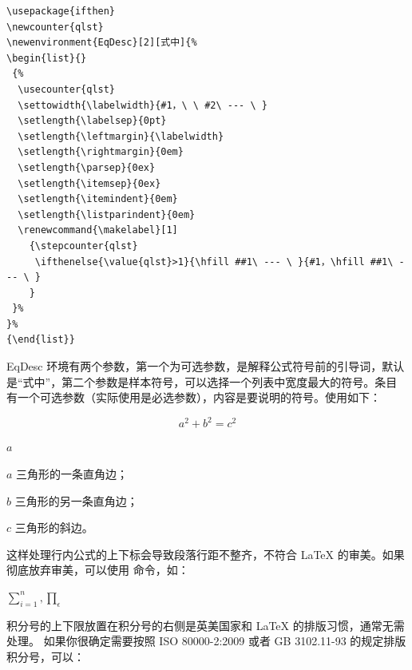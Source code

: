 \begin{verbatim}
\usepackage{ifthen}
\newcounter{qlst}
\newenvironment{EqDesc}[2][式中]{%
\begin{list}{}
 {%
  \usecounter{qlst}
  \settowidth{\labelwidth}{#1，\ \ #2\ --- \ }
  \setlength{\labelsep}{0pt}
  \setlength{\leftmargin}{\labelwidth}
  \setlength{\rightmargin}{0em}
  \setlength{\parsep}{0ex}
  \setlength{\itemsep}{0ex}
  \setlength{\itemindent}{0em}
  \setlength{\listparindent}{0em}
  \renewcommand{\makelabel}[1]
    {\stepcounter{qlst}
     \ifthenelse{\value{qlst}>1}{\hfill ##1\ --- \ }{#1，\hfill ##1\ --- \ }
    }
 }%
}%
{\end{list}}
\end{verbatim}

EqDesc
环境有两个参数，第一个为可选参数，是解释公式符号前的引导词，默认是``式中''，第二个参数是样本符号，可以选择一个列表中宽度最大的符号。条目  有一个可选参数（实际使用是必选参数），内容是要说明的符号。使用如下：

\begin{example}
\[ a^2+b^2=c^2 \]
\begin{EqDesc}[其中]{$a$}
   \item[$a$] 三角形的一条直角边；
   \item[$b$] 三角形的另一条直角边；
   \item[$c$] 三角形的斜边。
\end{EqDesc}
\end{example}




这样处理行内公式的上下标会导致段落行距不整齐，不符合 \LaTeX{}
的审美。如果彻底放弃审美，可以使用  命令，如：

\begin{example}
$\sum\limits_{i=1}^n, \prod\limits_\epsilon$
\end{example}



积分号的上下限放置在积分号的右侧是英美国家和 \LaTeX{}
的排版习惯，通常无需处理。
如果你很确定需要按照 ISO 80000-2:2009 或者 GB 3102.11-93 的规定排版积分号，可以：

